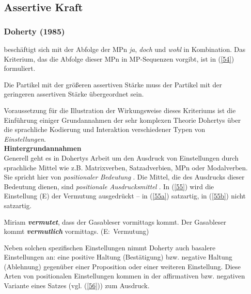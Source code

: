 \subsection{Assertive Kraft}
\label{sec:ass}
\subsubsection{Doherty (1985)}
\label{sec:doh85}
\citet{Doherty1985} beschäftigt sich mit der Abfolge der MPn \textit{ja}, \textit{doch} und \textit{wohl} in Kombination. Das Kriterium, das die Abfolge dieser MPn in MP-Sequenzen vorgibt, ist in (\ref{54}) formuliert. 

\begin{exe}
	\ex\label{54} 
		Die Partikel mit der größeren assertiven Stärke muss der Partikel mit der geringeren assertiven Stärke übergeordnet sein.   
			\hfill\hbox {\citet[83]{Doherty1985}}
\end{exe}
Voraussetzung für die Illustration der Wirkungsweise dieses Kriteriums ist die Einführung einiger Grundannahmen der sehr komplexen Theorie Dohertys über die sprachliche Kodierung und Interaktion verschiedener Typen von \textit{Einstellungen}. \\

\noindent
\textbf{Hintergrundannahmen}\\
Generell geht es in Dohertys Arbeit um den Ausdruck von Einstellungen durch sprachliche Mittel wie z.B.  Matrixverben, Satzadverbien, MPn  oder  Modalverben. Sie spricht hier von \textit{positionaler Bedeutung} . Die Mittel, die des Ausdrucks dieser Bedeutung dienen, sind \textit{positionale Ausdrucksmittel} . In (\ref{55}) wird die Einstellung (E) der Vermutung ausgedrückt – in  (\ref{55a}) satzartig, in (\ref{55b}) nicht satzartig.

\begin{exe}
	\ex\label{55} 
		\begin{xlist}	
			\ex\label{55a} Miriam \textbf{\textit{vermutet}}, dass der Gasableser vormittags kommt. 
			\ex\label{55b} Der Gasableser kommt \textbf{\textit{vermutlich}} vormittags. \hfill\hbox{(E: Vermutung)}
		\end{xlist}
\end{exe}
Neben solchen spezifischen Einstellungen nimmt Doherty auch \glq basalere\grq {} Einstellungen  an: eine positive Haltung (Bestätigung) bzw. negative Haltung (Ableh\-nung) gegenüber einer Proposition oder einer weiteren Einstellung. Diese Arten von positionalen Einstellungen kommen in der affirmativen bzw. negativen Variante eines Satzes (vgl. (\ref{56})) zum Ausdruck.

